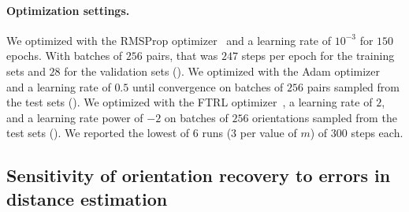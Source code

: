 \paragraph{Optimization settings.}
We optimized  with the RMSProp optimizer~\cite{tieleman2012rmsprop} and a learning rate of $10^{-3}$ for $150$ epochs.
With batches of $256$ pairs, that was $247$ steps per epoch for the training sets and $28$ for the validation sets ().
We optimized  with the Adam optimizer~\cite{kingma2014adam} and a learning rate of $0.5$ until convergence on batches of $256$ pairs sampled from the test sets ().
We optimized  with the FTRL optimizer~\cite{mcmahan2013ftrl}, a learning rate of $2$, and a learning rate power of $-2$ on batches of $256$ orientations sampled from the test sets ().
We reported the lowest of 6 runs (3 per value of $m$) of 300 steps each.


\subsection{Sensitivity of orientation recovery to errors in distance estimation}\label{sec:results:orientation-recovery:sensitivity}


